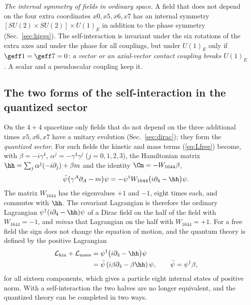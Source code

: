 \emph{The internal symmetry of fields in ordinary space.} A field that does not depend on the four
extra coordinates $x0,x5,x6,x7$ has an internal symmetry $[SU(2)\times SU(2)]\times U(1)_E$ in
addition to the phase symmetry (Sec.~\ref{sec:higgs}). The self-interaction is invariant under the six
rotations of the extra axes and under the phase for all couplings, but under $U(1)_E$ only if
$\geff1=\geff7=0$: \emph{a vector or an axial-vector contact coupling breaks $U(1)_E$.} A scalar and a
pseudoscalar coupling keep it.

\subsection{The two forms of the self-interaction in the quantized sector}
\label{sec:forms}

On the $4+4$ spacetime only fields that do not depend on the three additional times $x5,x6,x7$ have a
unitary evolution (Sec.~\ref{sec:dirac}); they form the \emph{quantized sector}. For such fields the
kinetic and mass terms (\ref{eq:Lfree}) become, with $\beta=-i\gamma^{4}$, $\alpha^{j}=-\gamma^{4}\gamma^{j}$
($j=0,1,2,3$), the Hamiltonian matrix $\hh=\sum_j\alpha^{j}(-i\partial_j)+\beta m$ and the identity
$\Cm=-W_{1644}\beta$,
\begin{equation}
\tilde\psi\big(\gamma^{A}\partial_A-m\big)\psi=-\psi^\dagger W_{1644}\big(i\partial_4-\hh\big)\psi .
\label{eq:indef}
\end{equation}
The matrix $W_{1644}$ has the eigenvalues $+1$ and $-1$, eight times each, and commutes with $\hh$.
The covariant Lagrangian is therefore the ordinary Lagrangian $\psi^\dagger(i\partial_4-\hh)\psi$ of
a Dirac field on the half of the field with $W_{1644}=-1$, and \emph{minus} that Lagrangian on the
half with $W_{1644}=+1$. For a free field the sign does not change the equation of motion, and the
quantum theory is defined by the positive Lagrangian
\begin{equation}
\begin{aligned}
\mathcal L_{\mathrm{kin}}+\mathcal L_{\mathrm{mass}}&=\psi^\dagger\big(i\partial_4-\hh\big)\psi\\
&=\bar\psi\,(i\beta\partial_4-\beta\hh)\,\psi,\qquad\bar\psi=\psi^\dagger\beta,
\end{aligned}
\label{eq:Lpos}
\end{equation}
for all sixteen components, which gives a particle eight internal states of positive norm. With a
self-interaction the two halves are no longer equivalent, and the quantized theory can be completed
in two ways.

